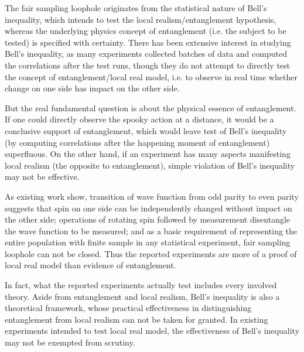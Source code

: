 \documentclass[prd,showpacs,twocolumn]{revtex4-1}
\begin{document}
The fair sampling loophole originates from the statistical nature of Bell's inequality, which intends to test the local realism/entanglement hypothesis, whereas the underlying physics concept of entanglement (i.e. the subject to be tested) is specified with certainty. There has been extensive interest in studying Bell's inequality, as many experiments collected batches of data and computed the correlations after the test runs, though they do not attempt to directly test the concept of entanglement/local real model, i.e. to observe in real time whether change on one side has impact on the other side.

But the real fundamental question is about the physical essence of entanglement. If one could directly observe the spooky action at a distance, it would be a conclusive support of entanglement, which would leave test of Bell's inequality (by computing correlations after the happening moment of entanglement) superfluous. On the other hand, if an experiment has many aspects manifesting local realism (the opposite to entanglement), simple violation of Bell's inequality may not be effective.

As existing work show, transition of wave function from odd parity to even parity suggests that spin on one side can be independently changed without impact on the other side; operations of rotating spin followed by measurement disentangle the wave function to be measured; and as a basic requirement of representing the entire population with finite sample in any statistical experiment, fair sampling loophole can not be closed. Thus the reported experiments are more of a proof of local real model than evidence of entanglement.

In fact, what the reported experiments actually test includes every involved theory. Aside from entanglement and local realism, Bell's inequality is also a theoretical framework, whose practical effectiveness in distinguishing entanglement from local realism can not be taken for granted. In existing experiments intended to test local real model, the effectiveness of Bell's inequality may not be exempted from scrutiny.

\acknowledgments
\end{document}

